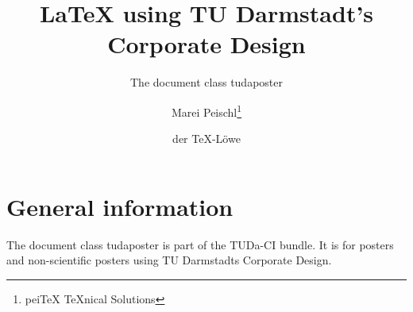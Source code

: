 \documentclass[
	english,%
	paper=a0,%
	accentcolor=9c,%
	logo=body,%
	footer=true,
]{tudaposter}
\begin{document}
\title{\LaTeX{} using TU Darmstadt's Corporate Design}
\subtitle{The document class tudaposter}
\author{Marei Peischl\thanks{pei\TeX{} \TeX{}nical Solutions}\and der \TeX-Löwe}

\titlegraphic{\color{red!20}\rule{\contentwidth}{.3\contentheight}}


\maketitle

\section*{General information}

The document class tudaposter is part of the TUDa-CI bundle. It is for posters and non-scientific posters using TU Darmstadts Corporate Design.
\end{document}
